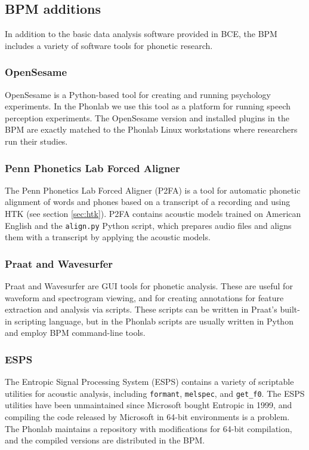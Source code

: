 \documentclass[a4paper]{article}
\begin{document}
    \subsection{BPM additions} \label{bpm-additions}
    In addition to the basic data analysis software provided in BCE, the BPM includes a variety of software tools for phonetic research.

      \subsubsection{OpenSesame}
      OpenSesame \cite{Matht2011} is a Python-based tool for creating and running psychology experiments. In the Phonlab we use this tool as a platform for running speech perception experiments. The OpenSesame version and installed plugins in the BPM are exactly matched to the Phonlab Linux workstations where researchers run their studies.

      \subsubsection{Penn Phonetics Lab Forced Aligner}
      The Penn Phonetics Lab Forced Aligner (P2FA) \cite{p2fa, p2fa-url} is a tool for automatic phonetic alignment of words and phones based on a transcript of a recording and using HTK (see section \ref{sec:htk}). P2FA contains acoustic models trained on American English and the {\tt align.py} Python script, which prepares audio files and aligns them with a transcript by applying the acoustic models.

      \subsubsection{Praat and Wavesurfer}
      Praat \cite{praat} and Wavesurfer \cite{wavesurfer} are GUI tools for phonetic analysis. These are useful for waveform and spectrogram viewing, and for creating annotations for feature extraction and analysis via scripts. These scripts can be written in Praat's built-in scripting language, but in the Phonlab scripts are usually written in Python and employ BPM command-line tools.

      \subsubsection{ESPS}
      The Entropic Signal Processing System (ESPS) contains a variety of scriptable utilities for acoustic analysis, including {\tt formant}, {\tt melspec}, and {\tt get\_f0}. The ESPS utilities have been unmaintained since Microsoft bought Entropic in 1999, and compiling the code released by Microsoft in 64-bit environments is a problem. The Phonlab maintains a repository \cite{esps} with modifications for 64-bit compilation, and the compiled versions are distributed in the BPM.
\end{document}
